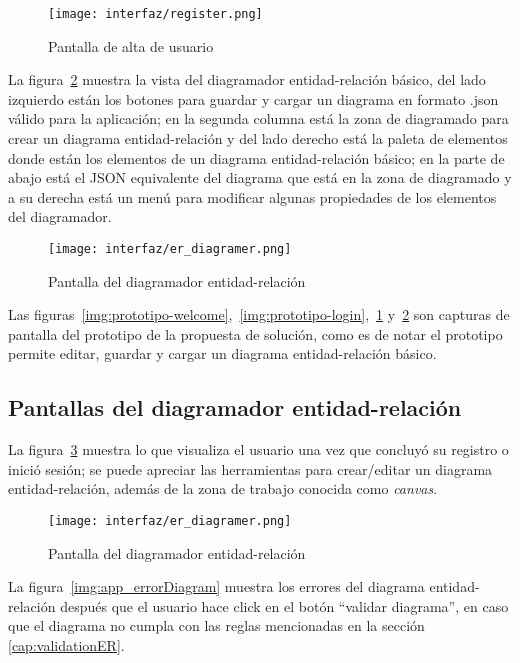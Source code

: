 \begin{figure}[H]
    \centering
    \texttt{[image: interfaz/register.png]}
    \caption{Pantalla de alta de usuario}
    \label{img:prototipo-signup}
\end{figure}
La figura~\ref{img:prototipo-er} muestra la vista del diagramador entidad-relación básico, del lado izquierdo están los botones para guardar y cargar un diagrama en formato .json válido para la aplicación; en la segunda columna está la zona de diagramado para crear un diagrama entidad-relación y del lado derecho está la paleta de elementos donde están los elementos de un diagrama entidad-relación básico; en la parte de abajo está el JSON equivalente del diagrama que está en la zona de diagramado y a su derecha está un menú para modificar algunas propiedades de los elementos del diagramador.

\begin{figure}[H]
    \centering
    \texttt{[image: interfaz/er\_diagramer.png]}
    \caption{Pantalla del diagramador entidad-relación}
    \label{img:prototipo-er}
\end{figure}



Las figuras~\ref{img:prototipo-welcome},~\ref{img:prototipo-login},~\ref{img:prototipo-signup} y~\ref{img:prototipo-er} son capturas de pantalla del prototipo de la propuesta de solución, como es de notar el prototipo permite editar, guardar y cargar un diagrama entidad-relación básico.

\subsection*{Pantallas del diagramador entidad-relación}

La figura~\ref{img:app_diagrammerER} muestra lo que visualiza el usuario una vez que concluyó su registro o inició sesión; se puede apreciar las herramientas para crear/editar un diagrama entidad-relación, además de la zona de trabajo conocida como \textit{canvas}.

\begin{figure}[H]
    \centering
    \texttt{[image: interfaz/er\_diagramer.png]}
    \caption{Pantalla del diagramador entidad-relación}
    \label{img:app_diagrammerER}
\end{figure}


La figura~\ref{img:app_errorDiagram} muestra los errores del diagrama entidad-relación después que el usuario hace click en el  botón ``validar diagrama'', en caso que el diagrama no cumpla con las reglas mencionadas en la sección \ref{cap:validationER}.

